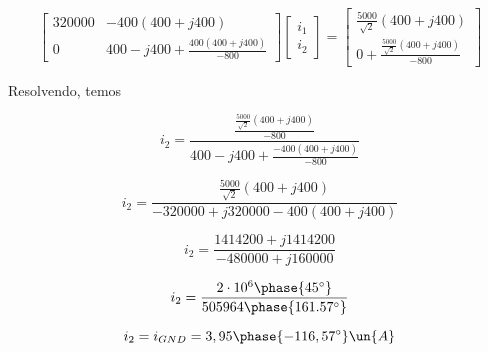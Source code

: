 \[
    \begin{bmatrix}
        320000 & - 400    (400 + j400)    \\
        0      & 400 - j400 + \frac{400(400 + j400)}{-800}
    \end{bmatrix}
    \begin{bmatrix}
        i_1 \\
        i_2
    \end{bmatrix}
    =
    \begin{bmatrix}
        \frac{5000}{\sqrt{2}} (400 + j400) \\
        0 + \frac{\frac{5000}{\sqrt{2}} (400 + j400)}{-800}
    \end{bmatrix}
\]

\endgroup

Resolvendo, temos

\[ i_2 = \frac{\frac{\frac{5000}{\sqrt{2}} (400 + j400)}{-800}}{400 - j400 + \frac{- 400(400 + j400)}{-800}} \]

\[ i_2 = \frac{\frac{5000}{\sqrt{2}} (400 + j400)}{-320000 + j320000 - 400(400 + j400)} \]

\[ i_2 = \frac{1414200 + j1414200}{-480000 + j160000} \]

\[ i_2 = \frac{2\cdot10^6\phase{45^{\circ}}}{505964\phase{161.57^{\circ}}} \]

\begin{equation}\label{eq:9.69.4}
    i_2 = i_{GND} = 3,95\phase{-116,57^{\circ}} \un{A}
\end{equation}


    
























